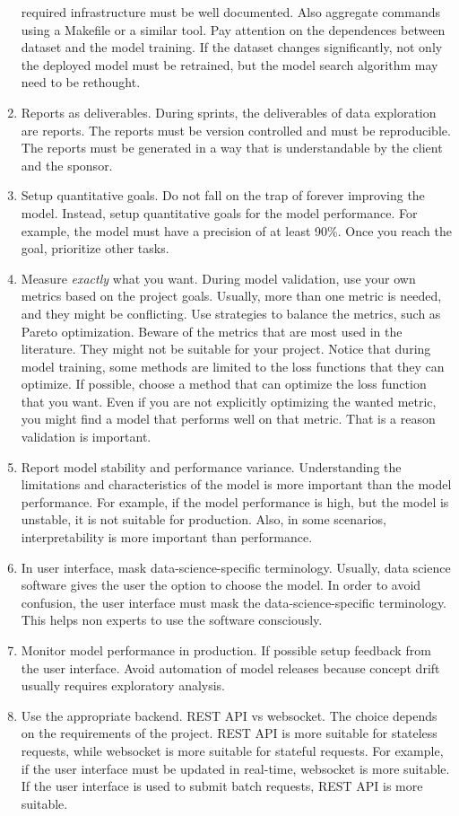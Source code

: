 \begin{enumerate}
    required infrastructure must be well documented.  Also aggregate commands using a
    Makefile or a similar tool.  Pay attention on the dependences between dataset and the
    model training.  If the dataset changes significantly, not only the deployed model
    must be retrained, but the model search algorithm may need to be rethought.
  \item Reports as deliverables.  During sprints, the deliverables of data exploration are
    reports.  The reports must be version controlled and must be reproducible.  The reports
    must be generated in a way that is understandable by the client and the sponsor.
  \item Setup quantitative goals.  Do not fall on the trap of forever improving the model.
    Instead, setup quantitative goals for the model performance.  For example, the model
    must have a precision of at least 90\%.  Once you reach the goal, prioritize other
    tasks.
  \item Measure \emph{exactly} what you want.  During model validation, use your own
    metrics based on the project goals.  Usually, more than one metric is needed, and they
    might be conflicting.  Use strategies to balance the metrics, such as Pareto
    optimization.  Beware of the metrics that are most used in the literature.  They might not
    be suitable for your project.  Notice that during model training, some methods are
    limited to the loss functions that they can optimize.  If possible, choose a method
    that can optimize the loss function that you want.  Even if you are not explicitly
    optimizing the wanted metric, you might find a model that performs well on that metric.
    That is a reason validation is important.
  \item Report model stability and performance variance.  Understanding the limitations
    and characteristics of the model is more important than the model performance.  For
    example, if the model performance is high, but the model is unstable, it is not
    suitable for production.  Also, in some scenarios, interpretability is more important than
    performance.
  \item In user interface, mask data-science-specific terminology.  Usually, data science
    software gives the user the option to choose the model.  In order to avoid confusion,
    the user interface must mask the data-science-specific terminology.  This helps non
    experts to use the software consciously.
  \item Monitor model performance in production.  If possible setup feedback from the user
    interface.  Avoid automation of model releases because concept drift usually requires
    exploratory analysis.
  \item Use the appropriate backend.  REST API vs websocket.  The choice depends on the
    requirements of the project.  REST API is more suitable for stateless requests, while
    websocket is more suitable for stateful requests.  For example, if the user interface
    must be updated in real-time, websocket is more suitable.  If the user interface is
    used to submit batch requests, REST API is more suitable.
\end{enumerate}

